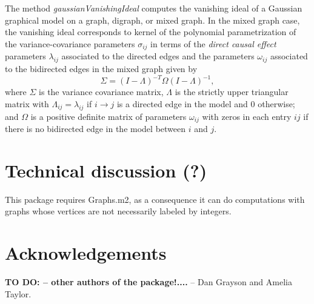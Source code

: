 \documentclass[letterpaper]{article}
\theoremstyle{definition}
\begin{document}
The method \textit{gaussianVanishingIdeal} computes the vanishing ideal of a
Gaussian graphical model on a graph, digraph, or mixed graph. In the mixed graph
case, the vanishing ideal corresponds to kernel of the polynomial parametrization of the
variance-covariance parameters  $\sigma_{ij}$ in terms of the \emph{direct
  causal effect} parameters $\lambda_{ij}$ associated to the directed edges  
and the parameters $\omega_{ij}$ associated to the
bidirected edges in the mixed graph given by
\[\Sigma = (I - \Lambda)^{-T}\Omega(I-\Lambda)^{-1},\] 
where $\Sigma$ is the variance covariance matrix, $\Lambda$ is the strictly
upper triangular matrix with $\Lambda_{ij} = \lambda_{ij}$ if $i\to j$ is a
directed edge in the model and 0 otherwise; and $\Omega$ is a positive definite
matrix of parameters $\omega_{ij}$ with zeros in each entry $ij$ if there is no
bidirected edge in the model between $i$ and $j$.





\section{Technical discussion (?) }
This package requires Graphs.m2, as a consequence it can do
computations with graphs whose vertices are not necessarily labeled by
integers. 


\section*{Acknowledgements} {\bf TO DO: -- other authors of the package!....} -- Dan Grayson and Amelia Taylor.
\end{document}
